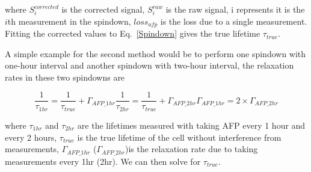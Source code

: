 where $S_{i}^{corrected}$ is the corrected signal, $S_{i}^{raw}$ is the raw signal, i represents it is the $i$th measurement in the spindown, $loss_{afp}$ is the loss due to a single measurement. Fitting the corrected values to Eq.~\ref{Spindown} gives the true lifetime $\tau_{true}$.

A simple example for the second method would be to perform one spindown with one-hour interval and another spindown with two-hour interval, the relaxation rates in these two spindowns are

\begin{subequations}
	\begin{equation}
	\frac{1}{\tau_{1hr}}=\frac{1}{\tau_{true}}+\Gamma_{AFP\_1hr}
	\end{equation}
	\begin{equation}
	\frac{1}{\tau_{2hr}}=\frac{1}{\tau_{true}}+\Gamma_{AFP\_2hr}
	\end{equation}
	\begin{equation}
	\Gamma_{AFP\_1hr}=2\times \Gamma_{AFP\_2hr}
	\end{equation}
\end{subequations}

where $\tau_{1hr}$ and $\tau_{2hr}$ are the lifetimes measured with taking AFP every 1 hour and every 2 hours, $\tau_{true}$ is the true lifetime of the cell without interference from measurements, $\Gamma_{AFP\_1hr}$ ($\Gamma_{AFP\_2hr}$)is the relaxation rate due to taking measurements every 1hr (2hr). We can then solve for $\tau_{true}$.